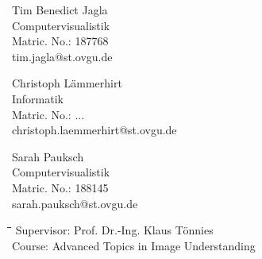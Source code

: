 \documentclass[liststotoc,11pt,a4paper]{article}
\begin{document}
\begin{figure}[htbp]
\begin{minipage}[t]{4cm}
\begin{flushleft}
Tim Benedict Jagla \\
Computervisualistik\\
Matric. No.: 187768\\ 
tim.jagla@st.ovgu.de\\
\end{flushleft}
\end{minipage}
\hfill
\begin{minipage}[t]{6cm}
\begin{flushleft}
Christoph Lämmerhirt\\
Informatik\\
Matric. No.: ...\\
christoph.laemmerhirt@st.ovgu.de\\
\end{flushleft}
\end{minipage}
\hfill
\begin{minipage}[t]{4cm}
\begin{flushleft} 
Sarah Pauksch\\
Computervisualistik\\
Matric. No.: 188145\\ 
sarah.pauksch@st.ovgu.de\\
\end{flushleft}
\end{minipage}
\end{figure}

\vspace{\fill}

\begin{figure}[htbp]
\begin{minipage}[b]{0.475\textwidth}
\vspace{0pt}
\begin{flushright}    
\begin {tabbing}
\hspace*{5cm}\=\hspace{2,5cm}\=\hspace{5cm}\=\hspace{2.5cm}\=\hspace{2.5cm}\=\kill
Supervisor:	\>Prof. Dr.-Ing. Klaus Tönnies\\
Course: \>Advanced Topics in Image Understanding\\

\end{tabbing}
\end{flushright}
\end{minipage}
\hfill
\begin{minipage}[b]{0.475\textwidth}
\centering
\end{minipage}
\end{figure}
\end{document}
